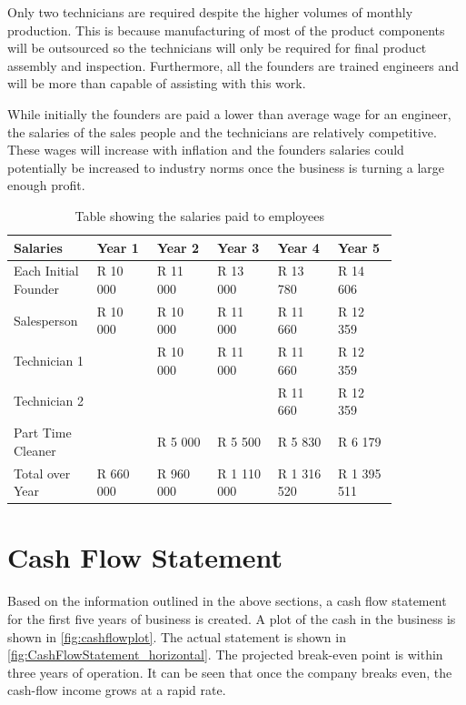 Only two technicians are required despite the higher volumes of monthly production. This is because manufacturing of most of the product components will be outsourced so the technicians will only be required for final product assembly and inspection. Furthermore, all the founders are trained engineers and will be more than capable of assisting with this work.

While initially the founders are paid a lower than average wage for an engineer, the salaries of the sales people and the technicians are relatively competitive. These wages will increase with inflation and the founders salaries could potentially be increased to industry norms once the business is turning a large enough profit.

\begin{table}[htbp]
  \centering
  \caption{Table showing the salaries paid to employees}
    \begin{tabular}{p{0.14\linewidth}p{0.14\linewidth}p{0.14\linewidth}p{0.14\linewidth}p{0.14\linewidth}p{0.14\linewidth}}
    \toprule
    Salaries & Year 1 & Year 2 & Year 3 & Year 4 & Year 5 \\
    \midrule
    \raggedright{Each Initial Founder} & R 10 000 & R 11 000 & R 13 000 & R 13 780 & R 14 606 \\
    Salesperson & R 10 000 & R 10 000 & R 11 000 & R 11 660 & R 12 359 \\
    Technician 1 &       & R 10 000 & R 11 000 & R 11 660 & R 12 359 \\
    Technician 2 &       &       &       & R 11 660 & R 12 359 \\
    \raggedright{Part Time Cleaner}&       & R 5 000 & R 5 500 & R 5 830 & R 6 179 \\
    \midrule
    \raggedright{Total over Year} & R 660 000 & R 960 000 & R 1 110 000 & R 1 316 520 & R 1 395 511 \\
    \bottomrule
    \end{tabular}%
  \label{tab:salaries}%
\end{table}%

\section{Cash Flow Statement}
Based on the information outlined in the above sections, a cash flow statement for the first five years of business is created. A plot of the cash in the business is shown in \cref{fig:cashflowplot}. The actual statement is shown in \cref{fig:CashFlowStatement_horizontal}. The projected break-even point is within three years of operation. It can be seen that once the company breaks even, the cash-flow income grows at a rapid rate.

